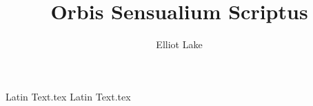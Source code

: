 \documentclass[11pt]{book}
\author{Elliot Lake}
\title{Orbis Sensualium Scriptus}
\begin{document}
\maketitle 
\tableofcontents

{Latin Text.tex}
{Latin Text.tex}
\end{document}
